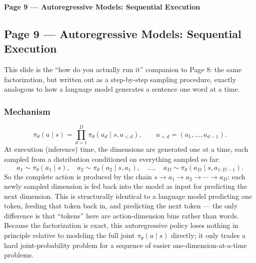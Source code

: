 \bigskip

\textbf{Page 9 --- Autoregressive Models: Sequential Execution}

\subsection*{Page 9 --- Autoregressive Models: Sequential Execution}

This slide is the ``how do you actually run it'' companion to Page 8: the same factorization, but written out as a step-by-step sampling procedure, exactly analogous to how a language model generates a sentence one word at a time.

\subsubsection*{Mechanism}

\[
\pi_\theta(a \mid s) = \prod_{d=1}^{D} \pi_\theta(a_d \mid s, a_{<d}), \qquad a_{<d} = (a_1,\dots,a_{d-1}).
\]
At execution (inference) time, the dimensions are generated one at a time, each sampled from a distribution conditioned on everything sampled so far:
\[
a_1 \sim \pi_\theta(a_1 \mid s), \quad a_2 \sim \pi_\theta(a_2 \mid s, a_1), \quad \dots, \quad a_D \sim \pi_\theta(a_D \mid s, a_{1:D-1}).
\]
So the complete action is produced by the chain $s \to a_1 \to a_2 \to \cdots \to a_D$: each newly sampled dimension is fed back into the model as input for predicting the next dimension. This is structurally identical to a language model predicting one token, feeding that token back in, and predicting the next token --- the only difference is that ``tokens'' here are action-dimension bins rather than words. Because the factorization is exact, this autoregressive policy loses nothing in principle relative to modeling the full joint $\pi_\theta(a\mid s)$ directly; it only trades a hard joint-probability problem for a sequence of easier one-dimension-at-a-time problems.
